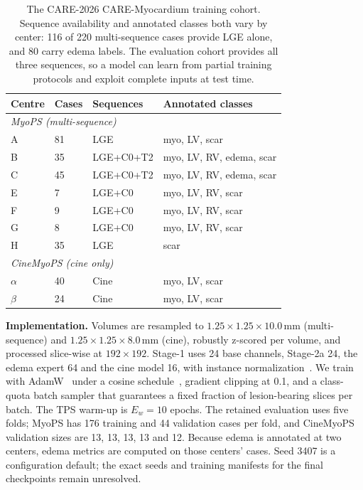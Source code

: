 \documentclass[runningheads]{llncs}
\begin{document}
\begin{table}[t]
\centering
\caption{The CARE-2026 CARE-Myocardium training cohort. Sequence availability and
annotated classes both vary by center: 116 of 220 multi-sequence cases provide LGE
alone, and 80 carry edema labels. The evaluation cohort provides all three
sequences, so a model can learn from partial training protocols and exploit
complete inputs at test time.}
\label{tab:cohort}
\setlength{\tabcolsep}{5pt}
\begin{tabular}{llll}
\toprule
Centre & Cases & Sequences & Annotated classes \\
\midrule
\multicolumn{4}{l}{\textit{MyoPS (multi-sequence)}}\\
A & 81 & LGE & myo, LV, scar \\
B & 35 & LGE+C0+T2 & myo, LV, RV, edema, scar \\
C & 45 & LGE+C0+T2 & myo, LV, RV, edema, scar \\
E & 7 & LGE+C0 & myo, LV, RV, scar \\
F & 9 & LGE+C0 & myo, LV, RV, scar \\
G & 8 & LGE+C0 & myo, LV, RV, scar \\
H & 35 & LGE & scar \\
\midrule
\multicolumn{4}{l}{\textit{CineMyoPS (cine only)}}\\
$\alpha$ & 40 & Cine & myo, LV, scar \\
$\beta$ & 24 & Cine & myo, LV, scar \\
\bottomrule
\end{tabular}
\end{table}

\noindent\textbf{Implementation.} Volumes are resampled to
$1.25\times1.25\times10.0$\,mm (multi-sequence) and
$1.25\times1.25\times8.0$\,mm (cine), robustly z-scored per volume, and processed
slice-wise at $192\times192$. Stage-1 uses 24 base channels, Stage-2a 24, the
edema expert 64 and the cine model 16, with instance
normalization~\cite{ulyanov2016instance}. We train with
AdamW~\cite{loshchilov2019adamw} under a cosine schedule~\cite{loshchilov2017sgdr},
gradient clipping at 0.1, and a class-quota batch sampler that guarantees a fixed
fraction of lesion-bearing slices per batch. The TPS warm-up is $E_w=10$ epochs.
The retained evaluation uses five folds; MyoPS has 176 training and 44
validation cases per fold, and CineMyoPS validation sizes are 13, 13, 13, 13 and 12. Because edema is
annotated at two centers, edema metrics are computed on those centers'
cases. Seed 3407 is a configuration default; the exact seeds and training
manifests for the final checkpoints remain unresolved.
\end{document}
